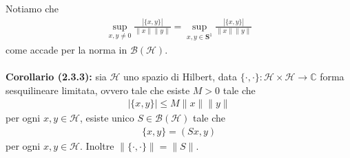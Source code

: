 \documentclass{article}
\numberwithin{equation}{subsection}
\begin{document}
Notiamo che 
\begin{align*}
    \sup_{x, y \neq 0}\frac{|\{x, y\}|}{\|x\|\|y\|} = \sup_{x, y \in \mathbf{S}^1}\frac{|\{x, y\}|}{\|x\|\|y\|} 
\end{align*}
come accade per la norma in $\mathcal{B}(\mathcal{H})$. \\ \\
\textbf{Corollario (2.3.3):} sia $\mathcal{H}$ uno spazio di Hilbert, data $\{\cdot, \cdot\} : \mathcal{H} \times \mathcal{H} \longrightarrow \mathbb{C}$ forma sesquilineare limitata, ovvero tale che esiste $M > 0$ tale che 
\begin{align*}
    |\{x, y\}| \leq M\|x\|\|y\| 
\end{align*}
per ogni $x, y \in \mathcal{H}$, esiste unico $S \in \mathcal{B}(\mathcal{H})$ tale che 
\begin{align*}
    \{x, y\} = (Sx, y) 
\end{align*}
per ogni $x, y \in \mathcal{H}$. Inoltre $\|\{\cdot, \cdot\}\| = \|S\|$. \\
\end{document}
